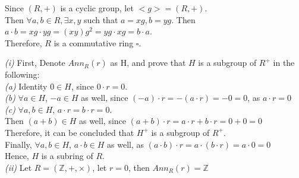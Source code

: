 \documentclass[11pt]{article}
\newenvironment{problem}[2][Problem]{\begin{trivlist}
\item[\hskip \labelsep {\bfseries #1}\hskip \labelsep {\bfseries #2.}]}{\end{trivlist}}
\begin{document}
\begin{problem}{(4)}
Since $(R,+)$ is a cyclic group, let $<g> = (R,+)$.\\
Then $\forall a,b \in R, \exists x, y$ such that $a = xg, b = yg$. Then $a\cdot b = xg \cdot yg =(xy)g^2 = yg \cdot xg = b\cdot a$.\\
Therefore, $R$ is a commutative ring $\square$.\\
\end{problem}

\begin{problem}{(5)}
\textit{(i)}
First, Denote $Ann_R(r)$ as H, and prove that $H$ is a subgroup of $R^+$ in the following:\\
\textit{(a)} Identity $0 \in H$, since $0 \cdot r =0$.\\
\textit{(b)} $\forall a \in H$, $-a \in H$ as well, since $(-a) \cdot r = -(a \cdot r) = -0 = 0$, as $a\cdot r = 0$\\
\textit{(c)} $\forall a,b \in H$, $a\cdot r = b\cdot r = 0$.\\
Then $(a+b) \in H$ as well, since $(a+b)\cdot r = a\cdot r + b\cdot r = 0 + 0 =0$\\
Therefore, it can be concluded that $H^+$ is a subgroup of $R^+$.\\
Finally, $\forall a,b \in H$, $a\cdot b \in H$ as well, as $(a\cdot b) \cdot r = a\cdot (b\cdot r) = a \cdot 0 = 0$\\
Hence, $H$ is a subring of $R$.\\
\textit{(ii)}
Let $R = (\mathbb{Z}, +, \times)$, let $r = 0$, then $Ann_R(r) = \mathbb{Z}$\\
\end{problem}
\end{document}
